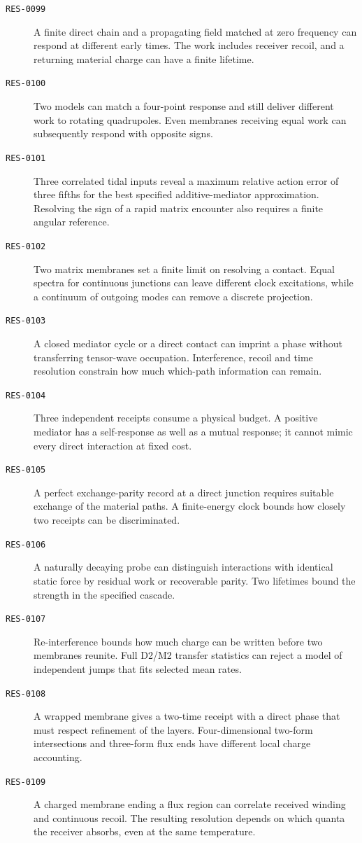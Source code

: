 \begin{description}
\item[\textnormal{\texttt{RES-0099}}] A finite direct chain and a propagating field matched at zero frequency can respond at different early times. The work includes receiver recoil, and a returning material charge can have a finite lifetime.
\item[\textnormal{\texttt{RES-0100}}] Two models can match a four-point response and still deliver different work to rotating quadrupoles. Even membranes receiving equal work can subsequently respond with opposite signs.
\item[\textnormal{\texttt{RES-0101}}] Three correlated tidal inputs reveal a maximum relative action error of three fifths for the best specified additive-mediator approximation. Resolving the sign of a rapid matrix encounter also requires a finite angular reference.
\item[\textnormal{\texttt{RES-0102}}] Two matrix membranes set a finite limit on resolving a contact. Equal spectra for continuous junctions can leave different clock excitations, while a continuum of outgoing modes can remove a discrete projection.
\item[\textnormal{\texttt{RES-0103}}] A closed mediator cycle or a direct contact can imprint a phase without transferring tensor-wave occupation. Interference, recoil and time resolution constrain how much which-path information can remain.
\item[\textnormal{\texttt{RES-0104}}] Three independent receipts consume a physical budget. A positive mediator has a self-response as well as a mutual response; it cannot mimic every direct interaction at fixed cost.
\item[\textnormal{\texttt{RES-0105}}] A perfect exchange-parity record at a direct junction requires suitable exchange of the material paths. A finite-energy clock bounds how closely two receipts can be discriminated.
\item[\textnormal{\texttt{RES-0106}}] A naturally decaying probe can distinguish interactions with identical static force by residual work or recoverable parity. Two lifetimes bound the strength in the specified cascade.
\item[\textnormal{\texttt{RES-0107}}] Re-interference bounds how much charge can be written before two membranes reunite. Full D2/M2 transfer statistics can reject a model of independent jumps that fits selected mean rates.
\item[\textnormal{\texttt{RES-0108}}] A wrapped membrane gives a two-time receipt with a direct phase that must respect refinement of the layers. Four-dimensional two-form intersections and three-form flux ends have different local charge accounting.
\item[\textnormal{\texttt{RES-0109}}] A charged membrane ending a flux region can correlate received winding and continuous recoil. The resulting resolution depends on which quanta the receiver absorbs, even at the same temperature.
\end{description}

